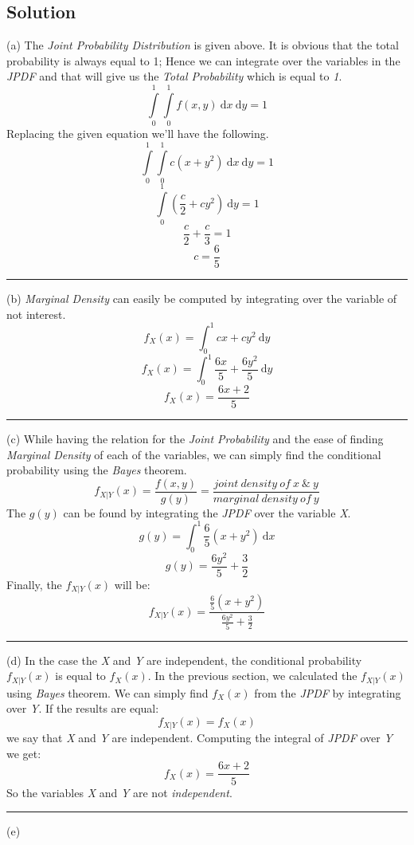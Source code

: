 \documentclass[12pt]{article}
\numberwithin{equation}{section}
\numberwithin{table}{section}
\numberwithin{figure}{section}
\begin{document}
\subsection*{Solution}
(a) The \textit{Joint Probability Distribution} is given above. It is obvious that the total probability is always equal to 1; Hence we can integrate over the variables in the \textit{JPDF} and that will give us the \textit{Total Probability} which is equal to \textit{1}.
$$
\int\limits_{0}^{1} \int\limits_{0}^{1}f(x, y)\ \mathrm{d}x \ \mathrm{d}y=1
$$
Replacing the given equation we'll have the following.
$$
\int\limits_{0}^{1} \int\limits_{0}^{1}c(x+ y^2)\ \mathrm{d}x \ \mathrm{d}y=1
$$ 
$$
\int\limits_{0}^{1}(\frac{c}{2} + cy^2) \ \mathrm{d}y=1
$$ 
$$
	\frac{c}{2} + \frac{c}{3} = 1
$$ 
$$
	\boxed{c = \frac{6}{5}}
$$
\noindent\rule{\textwidth}{.5pt}
(b) \textit{Marginal Density} can easily be computed by integrating over the variable of not interest. 
$$
	f_X (x) = \int_{0}^{1} cx + cy^2 \ \mathrm{d}y
$$
$$
	f_X (x) = \int_{0}^{1} \frac{6x}{5} + \frac{6y^2}{5} \ \mathrm{d}y
$$
$$
	\boxed{f_X (x) = \frac{6x+2}{5}}
$$
\noindent\rule{\textwidth}{.5pt}
(c) While having the relation for the \textit{Joint Probability} and the ease of finding \textit{Marginal Density} of each of the variables, we can simply find the conditional probability using the \textit{Bayes} theorem.
\begin{equation}
	f_{X|Y} (x) = \frac{f(x, y)}{g(y)}  = \frac{joint\ density\ of\ x\ \&\ y}{marginal\ density\ of\ y}
\end{equation}
The $g(y)$ can be found by integrating the \textit{JPDF} over the variable \textit{X}.
$$
g(y) = \int_{0}^{1} \frac{6}{5}(x+y^2)\ \mathrm{d}x
$$
$$
g(y) = \frac{6y^2}{5} + \frac{3}{2}
$$
Finally, the $f_{X|Y} (x)$ will be:
$$
	f_{X|Y} (x) = \frac{\frac{6}{5}(x+y^2)}{\frac{6y^2}{5} + \frac{3}{2}}
$$
\noindent\rule{\textwidth}{.5pt}
(d) In the case the \textit{X} and \textit{Y} are independent, the conditional probability $f_{X|Y} (x)$ is equal to $f_{X} (x)$. In the previous section, we calculated the $f_{X|Y} (x)$ using \textit{Bayes} theorem. We can simply find $f_{X} (x)$ from the \textit{JPDF} by integrating over \textit{Y}. If the results are equal:
$$
	f_{X|Y} (x) = f_{X} (x)
$$
we say that \textit{X} and \textit{Y} are independent.
Computing the integral of \textit{JPDF} over \textit{Y} we get:
$$
	f_X (x) = \frac{6x+2}{5}
$$
So the variables \textit{X} and \textit{Y} are not \textit{independent}.

\noindent\rule{\textwidth}{.5pt}
(e) 
\end{document}
